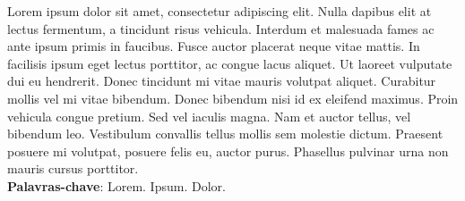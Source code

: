 \begin{resumo}[RESUMO]
\begin{SingleSpacing}

Lorem ipsum dolor sit amet, consectetur adipiscing elit. Nulla dapibus elit at lectus fermentum, a tincidunt risus vehicula. Interdum et malesuada fames ac ante ipsum primis in faucibus. Fusce auctor placerat neque vitae mattis. In facilisis ipsum eget lectus porttitor, ac congue lacus aliquet. Ut laoreet vulputate dui eu hendrerit. Donec tincidunt mi vitae mauris volutpat aliquet. Curabitur mollis vel mi vitae bibendum. Donec bibendum nisi id ex eleifend maximus. Proin vehicula congue pretium. Sed vel iaculis magna. Nam et auctor tellus, vel bibendum leo. Vestibulum convallis tellus mollis sem molestie dictum. Praesent posuere mi volutpat, posuere felis eu, auctor purus. Phasellus pulvinar urna non mauris cursus porttitor. \\

\textbf{Palavras-chave}: Lorem. Ipsum. Dolor.

\end{SingleSpacing}
\end{resumo}

